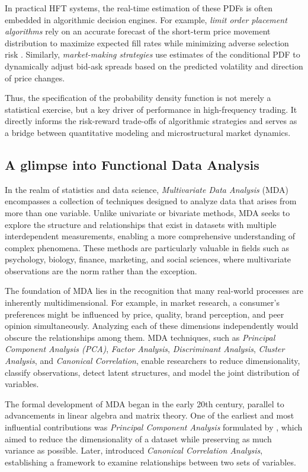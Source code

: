 \documentclass[article]{abntex2}
\begin{document}
In practical HFT systems, the real-time estimation of these PDFs is often embedded in algorithmic decision engines. For example, \textit{limit order placement algorithms} rely on an accurate forecast of the short-term price movement distribution to maximize expected fill rates while minimizing adverse selection risk . Similarly, \textit{market-making strategies} use estimates of the conditional PDF to dynamically adjust bid-ask spreads based on the predicted volatility and direction of price changes.

Thus, the specification of the probability density function is not merely a statistical exercise, but a key driver of performance in high-frequency trading. It directly informs the risk-reward trade-offs of algorithmic strategies and serves as a bridge between quantitative modeling and microstructural market dynamics.


\subsection{A glimpse into Functional Data Analysis}
In the realm of statistics and data science, \textit{Multivariate Data Analysis} (MDA) encompasses a collection of techniques designed to analyze data that arises from more than one variable. Unlike univariate or bivariate methods, MDA seeks to explore the structure and relationships that exist in datasets with multiple interdependent measurements, enabling a more comprehensive understanding of complex phenomena. These methods are particularly valuable in fields such as psychology, biology, finance, marketing, and social sciences, where multivariate observations are the norm rather than the exception.

The foundation of MDA lies in the recognition that many real-world processes are inherently multidimensional. For example, in market research, a consumer's preferences might be influenced by price, quality, brand perception, and peer opinion simultaneously. Analyzing each of these dimensions independently would obscure the relationships among them. MDA techniques, such as \textit{Principal Component Analysis (PCA)}, \textit{Factor Analysis}, \textit{Discriminant Analysis}, \textit{Cluster Analysis}, and \textit{Canonical Correlation}, enable researchers to reduce dimensionality, classify observations, detect latent structures, and model the joint distribution of variables.

The formal development of MDA began in the early 20th century, parallel to advancements in linear algebra and matrix theory. One of the earliest and most influential contributions was \textit{Principal Component Analysis} formulated by , which aimed to reduce the dimensionality of a dataset while preserving as much variance as possible. Later,  introduced \textit{Canonical Correlation Analysis}, establishing a framework to examine relationships between two sets of variables.
\end{document}
